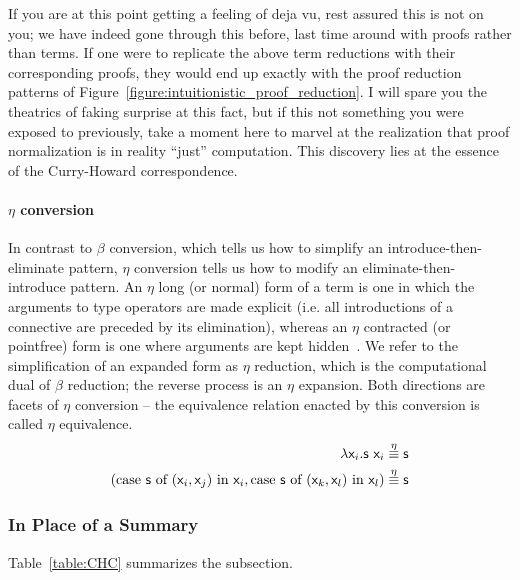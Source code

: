 If you are at this point getting a feeling of deja vu, rest assured this is not on you; we have indeed gone through this before, last time around with proofs rather than terms.
If one were to replicate the above term reductions with their corresponding proofs, they would end up exactly with the proof reduction patterns of Figure~\ref{figure:intuitionistic_proof_reduction}.
I will spare you the theatrics of faking surprise at this fact, but if this not something you were exposed to previously, take a moment here to marvel at the realization that proof normalization is in reality ``just'' computation.
This discovery lies at the essence of the Curry-Howard correspondence.

\paragraph{$\eta$ conversion}
In contrast to $\beta$ conversion, which tells us how to simplify an introduce-then-eliminate pattern, $\eta$ conversion tells us how to modify an eliminate-then-introduce pattern.
An $\eta$ long (or normal) form of a term is one in which the arguments to type operators are made explicit (i.e. all introductions of a connective are preceded by its elimination), whereas an $\eta$ contracted (or pointfree) form is one where arguments are kept hidden~\cite{prawitz1965proof}.
We refer to the simplification of an expanded form as $\eta$ reduction, which is the computational dual of $\beta$ reduction; 
the reverse process is an $\eta$ expansion.
Both directions are facets of $\eta$ conversion -- the equivalence relation enacted by this conversion is called $\eta$ equivalence.
\begin{align}
	\mathsf{\mathnormal{\lambda} \mathsf{x}_{\mathnormal{i}} .s~\mathsf{x}_{\mathnormal{i}} } & \overset{\eta}{\equiv} \mathsf{s}\\
	(\textrm{case \ensuremath{\mathsf{s}} of \ensuremath{\mathsf{(\mathsf{x}_{\mathnormal{i}}, \mathsf{x}_{\mathnormal{j}})}} in \ensuremath{\mathsf{\mathsf{x}_{\mathnormal{i}}}}}, \textrm{case \ensuremath{\mathsf{s}} of \ensuremath{\mathsf{(\mathsf{x}_{\mathnormal{k}},\mathsf{x}_{\mathnormal{l}})}} in \ensuremath{\mathsf{\mathsf{x}_{\mathnormal{l}}}}}) & \overset{\eta}{\equiv} \mathsf{s}
\end{align}


\subsubsection{In Place of a Summary}
Table~\ref{table:CHC} summarizes the subsection.

